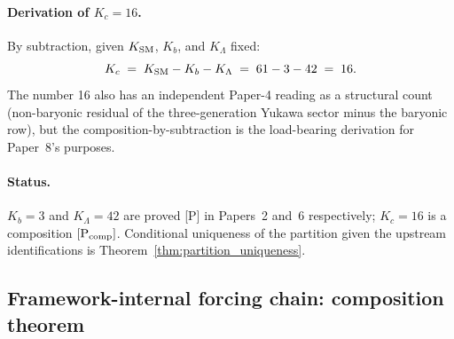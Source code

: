 \documentclass[11pt]{article}
\theoremstyle{plain}
\theoremstyle{definition}
\theoremstyle{remark}
\begin{document}
\paragraph{Derivation of $K_c = 16$.}  By subtraction, given $K_{\rm SM}$, $K_b$, and $K_\Lambda$ fixed:
\[
  K_c \;=\; K_{\rm SM} - K_b - K_\Lambda \;=\; 61 - 3 - 42 \;=\; 16.
\]
The number 16 also has an independent Paper-4 reading as a structural count (non-baryonic residual of the three-generation Yukawa sector minus the baryonic row), but the composition-by-subtraction is the load-bearing derivation for Paper~8's purposes.

\paragraph{Status.}  $K_b = 3$ and $K_\Lambda = 42$ are proved [P] in Papers~2 and~6 respectively; $K_c = 16$ is a composition $[\text{P}_{\rm comp}]$.  Conditional uniqueness of the partition given the upstream identifications is Theorem~\ref{thm:partition_uniqueness}.

\subsection{Framework-internal forcing chain: composition theorem}\label{supp:M5}
\end{document}
